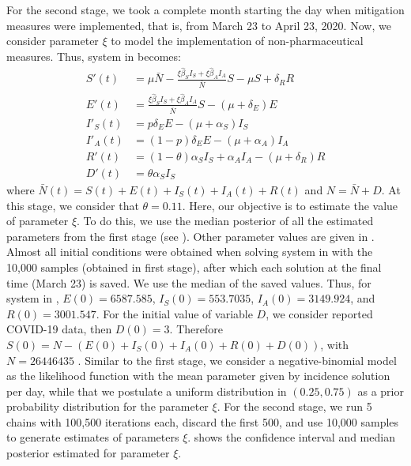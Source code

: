 \noindent For the second stage, we took a complete month starting the
day when mitigation measures were implemented, that is, from March 23
to April 23, 2020. Now, we consider parameter $\xi$ to model the
implementation of non-pharmaceutical measures. Thus, system in
 becomes:
\begin{equation}\label{model_stage2}
  \begin{aligned}
	S'(t)&=\mu \bar{N}-\frac{\xi\hat{\beta}_S
	I_S+\xi\hat{\beta}_AI_A}{\bar{N}}S-\mu S + \delta_R R\\
	E'(t)&= \frac{\xi\hat{\beta}_S
	I_S+\xi\hat{\beta}_AI_A}{\bar{N}}S-(\mu+\delta_E) E \\
	I'_S(t)&= p \delta_E E-(\mu+\alpha_S) I_S\\
	I'_A(t)&= (1-p) \delta_E E-(\mu+\alpha_A) I_A \\
	R'(t)&= (1-\theta) \alpha_S I_S+\alpha_A I_A-(\mu+\delta_R) R \\
	D'(t)&= \theta \alpha_S I_S
  \end{aligned}
\end{equation}
where $\bar{N}(t)=S(t)+E(t)+I_S(t)+I_A(t)+R(t)$ and $N=\bar{N}+D$. At
this stage, we consider that $\theta = 0.11$. Here, our objective is
to estimate the value of parameter $\xi$. To do this, we use the
median posterior of all the estimated parameters from the first stage
(see ). Other parameter values are given in
. Almost all initial conditions were obtained
when solving system in  with the 10,000 samples
(obtained in first stage), after which each solution at the final time
(March 23) is saved. We use the median of the saved values. Thus, for
system in , $E(0) = 6587.585$, $I_S(0) = 553.7035$,
$I_A(0) = 3149.924$, and $R(0) = 3001.547$. For the initial value of
variable $D$, we consider reported COVID-19 data, then $D(0) = 3$.
Therefore $S(0) = N - (E(0) + I_S(0) + I_A(0) + R(0) + D(0))$, with $N
= 26446435$ \cite{conavi2020}. Similar to the first stage, we consider
a negative-binomial model as the likelihood function with the mean
parameter given by incidence solution per day, while that we postulate
a uniform distribution in $(0.25,0.75)$ as a prior probability
distribution for the parameter $\xi$.
For the second stage, we run 5 chains with 100,500 iterations each,
discard the first 500, and use 10,000 samples to generate estimates of
parameters $\xi$.  shows the confidence interval
and median posterior estimated for parameter $\xi$.
